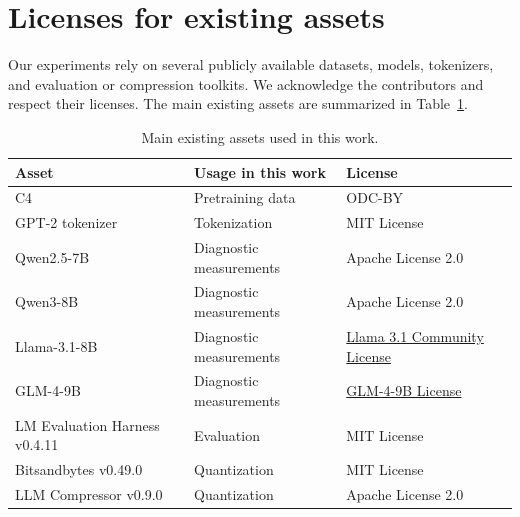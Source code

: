 \documentclass{article}
\theoremstyle{plain}
\theoremstyle{definition}
\theoremstyle{remark}
\begin{document}
\makeatletter
\if@preprint
\else

\section{Licenses for existing assets}
\label{app:license}

Our experiments rely on several publicly available datasets, models, tokenizers, and evaluation or compression toolkits. We acknowledge the contributors and respect their licenses. The main existing assets are summarized in Table~\ref{tab:existing_assets_license}.

\begin{table}[h]
    \centering
	\setlength\tabcolsep{4pt}
    \caption{Main existing assets used in this work.}
    \label{tab:existing_assets_license}
    \begin{tabular}{lll}
    \toprule
    Asset & Usage in this work & License \\
    \midrule
    C4 & Pretraining data & ODC-BY \\
    GPT-2 tokenizer & Tokenization & MIT License \\
    Qwen2.5-7B & Diagnostic measurements & Apache License 2.0 \\
    Qwen3-8B & Diagnostic measurements & Apache License 2.0 \\
    Llama-3.1-8B & Diagnostic measurements & \href{https://github.com/meta-llama/llama-models/blob/main/models/llama3_1/LICENSE}{Llama 3.1 Community License} \\
    GLM-4-9B & Diagnostic measurements & \href{https://huggingface.co/zai-org/glm-4-9b/blob/main/LICENSE}{GLM-4-9B License} \\
    LM Evaluation Harness v0.4.11 & Evaluation & MIT License \\
    Bitsandbytes v0.49.0 & Quantization & MIT License \\
    LLM Compressor v0.9.0 & Quantization & Apache License 2.0 \\
    \bottomrule
    \end{tabular}
\end{table}

\newpage


\fi
\makeatother
\end{document}
